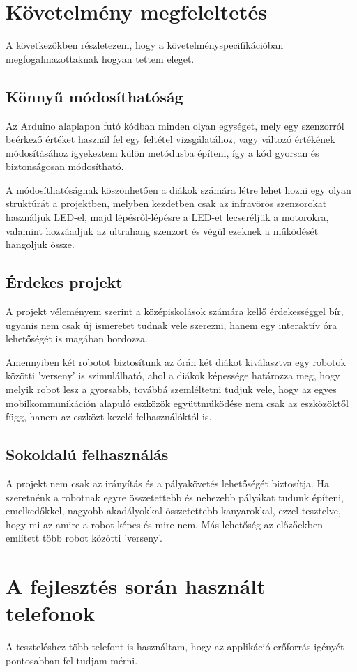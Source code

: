 \documentclass[]{thesis-ekf}
\theoremstyle{definition}
\begin{document}
\section{Követelmény megfeleltetés}
A következőkben részletezem, hogy a követelményspecifikációban megfogalmazottaknak hogyan tettem eleget.
\subsection{Könnyű módosíthatóság}
Az Arduino alaplapon futó kódban minden olyan egységet, mely egy szenzorról beérkező értéket használ fel egy feltétel vizsgálatához, vagy változó értékének módosításához igyekeztem külön metódusba építeni, így a kód gyorsan és biztonságosan módosítható.

A módosíthatóságnak köszönhetően a diákok számára létre lehet hozni egy olyan struktúrát a projektben, melyben kezdetben csak az infravörös szenzorokat használjuk LED-el, majd lépésről-lépésre a LED-et lecseréljük a motorokra, valamint hozzáadjuk az ultrahang szenzort és végül ezeknek a működését hangoljuk össze.
\subsection{Érdekes projekt}
A projekt véleményem szerint a középiskolások számára kellő érdekességgel bír, ugyanis nem csak új ismeretet tudnak vele szerezni, hanem egy interaktív óra lehetőségét is magában hordozza.

Amennyiben két robotot biztosítunk az órán két diákot kiválasztva egy robotok közötti 'verseny' is szimulálható, ahol a diákok képessége határozza meg, hogy melyik robot lesz a gyorsabb, továbbá szemléltetni tudjuk vele, hogy az egyes mobilkommunikáción alapuló eszközök együttműködése nem csak az eszközöktől függ, hanem az eszközt kezelő felhasználóktól is.
\subsection{Sokoldalú felhasználás}
A projekt nem csak az irányítás és a pályakövetés lehetőségét biztosítja. Ha szeretnénk a robotnak egyre összetettebb és nehezebb pályákat tudunk építeni, emelkedőkkel, nagyobb akadályokkal összetettebb kanyarokkal, ezzel tesztelve, hogy mi az amire a robot képes és mire nem. Más lehetőség az előzőekben említett több robot közötti 'verseny'.
\section{A fejlesztés során használt telefonok}\label{telefonok}
A teszteléshez több telefont is használtam, hogy az applikáció erőforrás igényét pontosabban fel tudjam mérni.
\end{document}
